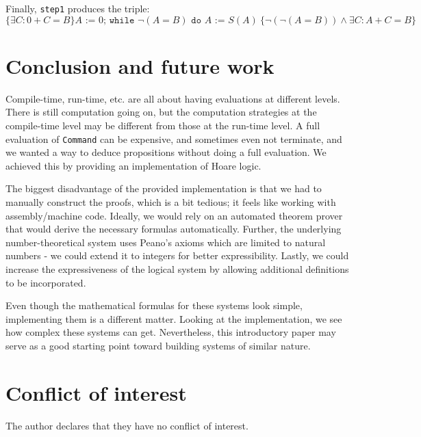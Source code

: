\documentclass{article}
\begin{document}
Finally, \texttt{step1} produces the triple:
$$\{\exists C: 0+C=B\} A \texttt{ := } 0 \texttt{; while } \neg(A = B) \texttt{ do }A\texttt{ := }S(A) \ \{\neg (\neg (A = B)) \land \exists C: A + C = B\}$$

\section{Conclusion and future work}

Compile-time, run-time, etc. are all about having evaluations at different levels. There is still computation going on, but the computation strategies at the compile-time level may be different from those at the run-time level. A full evaluation of \texttt{Command} can be expensive, and sometimes even not terminate, and we wanted a way to deduce propositions without doing a full evaluation. We achieved this by providing an implementation of Hoare logic.

The biggest disadvantage of the provided implementation is that we had to manually construct the proofs, which is a bit tedious; it feels like working with assembly/machine code. Ideally, we would rely on an automated theorem prover that would derive the necessary formulas automatically. Further, the underlying number-theoretical system uses Peano's axioms which are limited to natural numbers - we could extend it to integers for better expressibility. Lastly, we could increase the expressiveness of the logical system by allowing additional definitions to be incorporated.

Even though the mathematical formulas for these systems look simple, implementing them is a different matter. Looking at the implementation, we see how complex these systems can get. Nevertheless, this introductory paper may serve as a good starting point toward building systems of similar nature.

\section{Conflict of interest}

The author declares that they have no conflict of interest.
\end{document}
